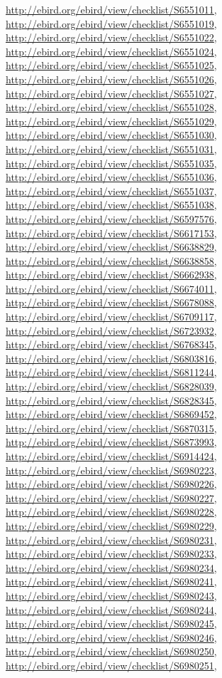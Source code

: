 \documentclass[9pt, article]{memoir}
\begin{document}
\begin{multicols}{2}
\url{http://ebird.org/ebird/view/checklist/S6551011}, 
\url{http://ebird.org/ebird/view/checklist/S6551019}, 
\url{http://ebird.org/ebird/view/checklist/S6551022}, 
\url{http://ebird.org/ebird/view/checklist/S6551024}, 
\url{http://ebird.org/ebird/view/checklist/S6551025}, 
\url{http://ebird.org/ebird/view/checklist/S6551026}, 
\url{http://ebird.org/ebird/view/checklist/S6551027}, 
\url{http://ebird.org/ebird/view/checklist/S6551028}, 
\url{http://ebird.org/ebird/view/checklist/S6551029}, 
\url{http://ebird.org/ebird/view/checklist/S6551030}, 
\url{http://ebird.org/ebird/view/checklist/S6551031}, 
\url{http://ebird.org/ebird/view/checklist/S6551035}, 
\url{http://ebird.org/ebird/view/checklist/S6551036}, 
\url{http://ebird.org/ebird/view/checklist/S6551037}, 
\url{http://ebird.org/ebird/view/checklist/S6551038}, 
\url{http://ebird.org/ebird/view/checklist/S6597576}, 
\url{http://ebird.org/ebird/view/checklist/S6617153}, 
\url{http://ebird.org/ebird/view/checklist/S6638829}, 
\url{http://ebird.org/ebird/view/checklist/S6638858}, 
\url{http://ebird.org/ebird/view/checklist/S6662938}, 
\url{http://ebird.org/ebird/view/checklist/S6674011}, 
\url{http://ebird.org/ebird/view/checklist/S6678088}, 
\url{http://ebird.org/ebird/view/checklist/S6709117}, 
\url{http://ebird.org/ebird/view/checklist/S6723932}, 
\url{http://ebird.org/ebird/view/checklist/S6768345}, 
\url{http://ebird.org/ebird/view/checklist/S6803816}, 
\url{http://ebird.org/ebird/view/checklist/S6811244}, 
\url{http://ebird.org/ebird/view/checklist/S6828039}, 
\url{http://ebird.org/ebird/view/checklist/S6828345}, 
\url{http://ebird.org/ebird/view/checklist/S6869452}, 
\url{http://ebird.org/ebird/view/checklist/S6870315}, 
\url{http://ebird.org/ebird/view/checklist/S6873993}, 
\url{http://ebird.org/ebird/view/checklist/S6914424}, 
\url{http://ebird.org/ebird/view/checklist/S6980223}, 
\url{http://ebird.org/ebird/view/checklist/S6980226}, 
\url{http://ebird.org/ebird/view/checklist/S6980227}, 
\url{http://ebird.org/ebird/view/checklist/S6980228}, 
\url{http://ebird.org/ebird/view/checklist/S6980229}, 
\url{http://ebird.org/ebird/view/checklist/S6980231}, 
\url{http://ebird.org/ebird/view/checklist/S6980233}, 
\url{http://ebird.org/ebird/view/checklist/S6980234}, 
\url{http://ebird.org/ebird/view/checklist/S6980241}, 
\url{http://ebird.org/ebird/view/checklist/S6980243}, 
\url{http://ebird.org/ebird/view/checklist/S6980244}, 
\url{http://ebird.org/ebird/view/checklist/S6980245}, 
\url{http://ebird.org/ebird/view/checklist/S6980246}, 
\url{http://ebird.org/ebird/view/checklist/S6980250}, 
\url{http://ebird.org/ebird/view/checklist/S6980251}, 

\end{multicols}
\end{document}
